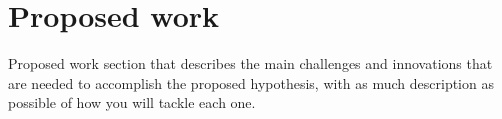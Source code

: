 \section{Proposed work}
Proposed work section that describes the main challenges and
innovations that are needed to accomplish the proposed hypothesis, with
as much description as possible of how you will tackle each one.